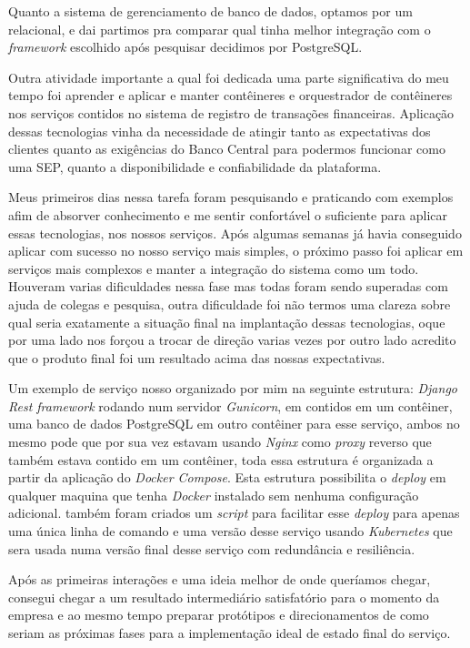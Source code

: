 \documentclass{ufscar}
\begin{document}
Quanto a sistema de gerenciamento de banco de dados, optamos por um relacional, e dai partimos pra comparar qual tinha melhor integração com o \textit{framework} escolhido após pesquisar decidimos por PostgreSQL.

Outra atividade importante a qual foi dedicada uma parte significativa do meu tempo foi aprender e aplicar e manter contêineres e orquestrador de contêineres nos serviços contidos no sistema de registro de transações financeiras. Aplicação dessas tecnologias vinha da necessidade de atingir tanto as expectativas dos clientes quanto as exigências do Banco Central para podermos funcionar como uma SEP, quanto a disponibilidade e confiabilidade da plataforma.

Meus primeiros dias nessa tarefa foram pesquisando e praticando com exemplos afim de absorver conhecimento e me sentir confortável o suficiente para aplicar essas tecnologias, nos nossos serviços. Após algumas semanas já havia conseguido aplicar com sucesso no nosso serviço mais simples, o próximo passo foi aplicar em serviços mais complexos e manter a integração do sistema como um todo. Houveram varias dificuldades nessa fase mas todas foram sendo superadas com ajuda de colegas e pesquisa, outra dificuldade foi não termos uma clareza sobre qual seria exatamente a situação final na implantação dessas tecnologias, oque por uma lado nos forçou a trocar de direção varias vezes por outro lado acredito que o produto final foi um resultado acima das nossas expectativas.

Um exemplo de serviço nosso organizado por mim na seguinte estrutura: \textit{Django Rest framework} rodando num servidor \textit{Gunicorn}, em contidos em um contêiner, uma banco de dados PostgreSQL em outro contêiner para esse serviço, ambos no mesmo pode que por sua vez estavam usando \textit{Nginx} como \textit{proxy} reverso que também estava contido em um contêiner, toda essa estrutura é organizada a partir da aplicação do \textit{Docker Compose}. Esta estrutura possibilita o \textit{deploy} em qualquer maquina que tenha \textit{Docker} instalado sem nenhuma configuração adicional. também foram criados um \textit{script} para facilitar esse \textit{deploy} para apenas uma única linha de comando e uma versão desse serviço usando \textit{Kubernetes} que sera usada  numa versão final desse serviço com redundância e resiliência.

Após as primeiras interações e uma ideia melhor de onde queríamos chegar, consegui chegar a um resultado intermediário satisfatório para o momento da empresa e ao mesmo tempo preparar protótipos e direcionamentos de como seriam as próximas fases para a implementação ideal de estado final do serviço.
\end{document}
